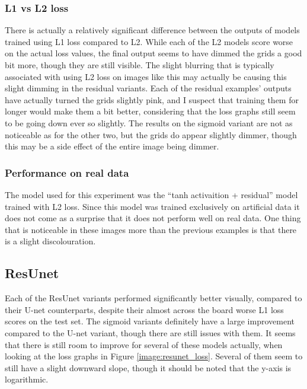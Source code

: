 \subsubsection{L1 vs L2 loss}
There is actually a relatively significant difference between the outputs of models trained using L1 loss compared to L2. While each of the L2 models score worse on the actual loss values, the final output seems to have dimmed the grids a good bit more, though they are still visible. The slight blurring that is typically associated with using L2 loss on images like this may actually be causing this slight dimming in the residual variants. Each of the residual examples' outputs have actually turned the grids slightly pink, and I suspect that training them for longer would make them a bit better, considering that the loss graphs still seem to be going down ever so slightly. The results on the sigmoid variant are not as noticeable as for the other two, but the grids do appear slightly dimmer, though this may be a side effect of the entire image being dimmer.

\subsubsection{Performance on real data}
The model used for this experiment was the ``tanh activaition + residual'' model trained with L2 loss. Since this model was trained exclusively on artificial data it does not come as a surprise that it does not perform well on real data. One thing that is noticeable in these images more than the previous examples is that there is a slight discolouration.

\subsection{ResUnet}
Each of the ResUnet variants performed significantly better visually, compared to their U-net counterparts, despite their almost across the board worse L1 loss scores on the test set. The sigmoid variants definitely have a large improvement compared to the U-net variant, though there are still issues with them. It seems that there is still room to improve for several of these models actually, when looking at the loss graphs in Figure \ref{image:resunet_loss}. Several of them seem to still have a slight downward slope, though it should be noted that the y-axis is logarithmic.

